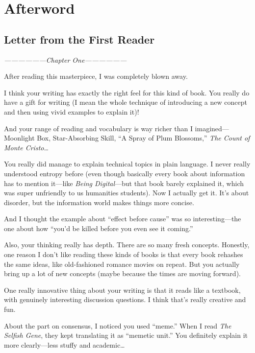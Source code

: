 \chapter*{Afterword}
{}
\thispagestyle{plain}

\section{Letter from the First Reader}
\begin{myquote}
\textit{------------------Chapter One------------------}

After reading this masterpiece, I was completely blown away.

I think your writing has exactly the right feel for this kind of book. You really do have a gift for writing (I mean the whole technique of introducing a new concept and then using vivid examples to explain it)!

And your range of reading and vocabulary is way richer than I imagined---Moonlight Box, Star-Absorbing Skill, ``A Spray of Plum Blossoms,'' \emph{The Count of Monte Cristo}\ldots

You really did manage to explain technical topics in plain language. I never really understood entropy before (even though basically every book about information has to mention it---like \emph{Being Digital}---but that book barely explained it, which was super unfriendly to us humanities students). Now I actually get it. It's about disorder, but the information world makes things more concise.

And I thought the example about ``effect before cause'' was so interesting---the one about how ``you'd be killed before you even see it coming.''

Also, your thinking really has depth. There are so many fresh concepts. Honestly, one reason I don't like reading these kinds of books is that every book rehashes the same ideas, like old-fashioned romance movies on repeat. But you actually bring up a lot of new concepts (maybe because the times are moving forward).

One really innovative thing about your writing is that it reads like a textbook, with genuinely interesting discussion questions. I think that's really creative and fun.

About the part on consensus, I noticed you used ``meme.'' When I read \emph{The Selfish Gene}, they kept translating it as ``memetic unit.'' You definitely explain it more clearly---less stuffy and academic\ldots



\end{myquote}
